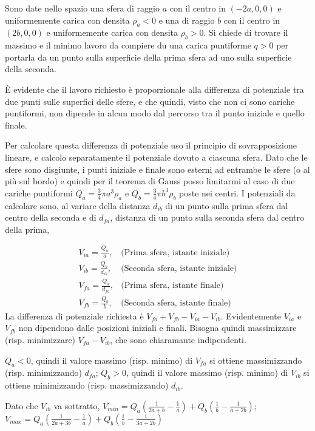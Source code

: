 \documentclass[../main.tex]{subfiles}
\begin{document}

\textex
Sono date nello spazio una sfera di raggio $a$ con il centro in $(-2a,0,0)$ e uniformemente carica con densita $\rho_a<0$ e una di raggio $b$ con il centro in $(2b,0,0)$ e uniformemente carica con densita $\rho_b>0$. Si chiede di trovare il massimo e il minimo lavoro da compiere du una carica puntiforme $q>0$ per portarla da un punto sulla superficie della prima sfera ad uno sulla superficie della seconda.

\solution
\`E evidente che il lavoro richiesto \`e proporzionale alla differenza di potenziale tra due punti sulle superfici delle sfere, e che quindi, visto che non ci sono cariche puntiformi, non dipende in alcun modo dal percorso tra il punto iniziale e quello finale.

Per calcolare questa differenza di potenziale uso il principio di sovrapposizione lineare, e calcolo separatamente il potenziale dovuto a ciascuna sfera. Dato che le sfere sono disgiunte, i punti iniziale e finale sono esterni ad entrambe le sfere (o al pi\`u sul bordo) e quindi per il teorema di Gauss posso limitarmi al caso di due cariche puntiformi $Q_a=\frac{3}{4} \pi a^3 \rho_a $ e $Q_b=\frac{3}{4} \pi b^3 \rho_b $  poste nei centri.\newline
I potenziali da calcolare sono, al variare della distanza $d_{ib}$ di un punto sulla prima sfera dal centro della seconda e di $d_{fa}$, distanza di un punto sulla seconda sfera dal centro della prima,

\begin{subequations}
  \label{dsc:potenziali}
  \begin{align}
    V_{ia}=\frac{Q_a}{a},	& \text{(Prima sfera, istante iniziale)} \\
    V_{ib}=\frac{Q_b}{d_{ib}},	& \text{(Seconda sfera, istante iniziale)} \\
    V_{fa}=\frac{Q_a}{d_{fa}},	& \text{(Prima sfera, istante finale)} \\
    V_{fb}=\frac{Q_b}{b},	& \text{(Seconda sfera, istante finale)}
  \end{align}
\end{subequations}
La differenza di potenziale richiesta \`e $V_{fa}+V_{fb}-V_{ia}-V_{ib}$.
Evidentemente $V_{ia}$ e $V_{fb}$ non dipendono dalle posizioni iniziali e finali. Bisogna quindi massimizzare (risp. minimizzare) $V_{fa}-V_{ib}$, che sono chiaramante indipendenti.

$Q_a<0$, quindi il valore massimo (risp. minimo) di $V_{fa}$ si ottiene massimizzando (risp. minimizzando) $d_{fa}$; $Q_b>0$, quindi il valore massimo (risp. minimo) di $V_{ib}$ si ottiene minimizzando (risp. massimizzando) $d_{ib}$.

Dato che $V_{ib}$ va sottratto, $V_{min}=Q_a(\frac{1}{2a+b}- \frac{1}{a})+Q_b(\frac{1}{b}-\frac{1}{a+2b})$; $V_{max}=Q_a(\frac{1}{2a+3b}- \frac{1}{a})+Q_b(\frac{1}{b}-\frac{1}{3a+2b})$
\end{document}
